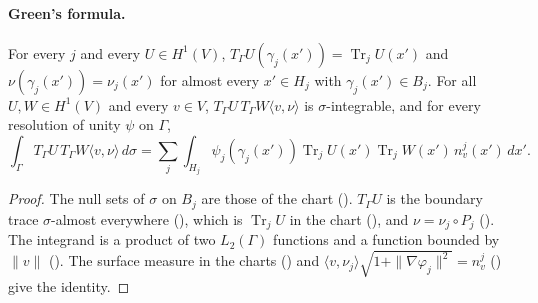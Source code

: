 \paragraph{Green's formula.}

\begin{lemma}
\label{lem:boundary-integral-charts}
\leanok
{}
For every $j$ and every
$U \in H^1(V)$, $T_\Gamma U(\gamma_j(x')) = \operatorname{Tr}_j U(x')$ and
$\nu(\gamma_j(x')) = \nu_j(x')$ for almost every $x' \in H_j$ with $\gamma_j(x') \in B_j$. For all
$U, W \in H^1(V)$ and every $v \in V$, $T_\Gamma U \, T_\Gamma W \langle v, \nu \rangle$ is
$\sigma$-integrable, and for every resolution of unity $\psi$ on $\Gamma$,
\[
  \int_\Gamma T_\Gamma U \, T_\Gamma W \langle v, \nu \rangle \, d\sigma
  = \sum_j \int_{H_j} \psi_j(\gamma_j(x')) \operatorname{Tr}_j U(x') \operatorname{Tr}_j W(x') \,
    n^j_v(x') \, dx' .
\]
\end{lemma}

\begin{proof}
\leanok
The null sets of $\sigma$ on $B_j$ are those of the chart ().
$T_\Gamma U$ is the boundary trace $\sigma$-almost everywhere (), which
is $\operatorname{Tr}_j U$ in the chart (), and $\nu = \nu_j \circ
P_j$ (). The integrand is a product of two $L_2(\Gamma)$
functions and a function bounded by $\|v\|$ (). The surface measure in
the charts () and
$\langle v, \nu_j \rangle \sqrt{1 + \|\nabla\varphi_j\|^2} = n^j_v$ ()
give the identity.
\end{proof}

